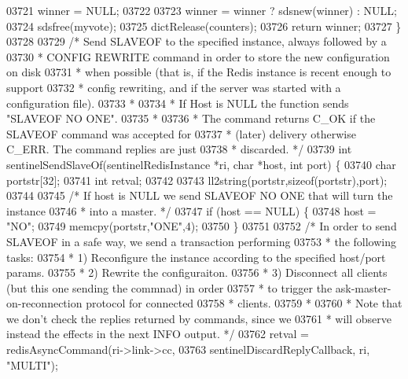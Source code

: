 \begin{DoxyCode}
{{{{{{{{{{{{{{{{{{{{{{{{{{{{{{{{{{{{{{{{{{{{{{{{{{{{{{{{{{{{{{{{{{{{{{{{{{{{{{{{{{{03721         winner = NULL;
03722 
03723     winner = winner ? sdsnew(winner) : NULL;
03724     sdsfree(myvote);
03725     dictRelease(counters);
03726     \textcolor{keywordflow}{return} winner;
03727 \}
03728 
03729 \textcolor{comment}{/* Send SLAVEOF to the specified instance, always followed by a}
03730 \textcolor{comment}{ * CONFIG REWRITE command in order to store the new configuration on disk}
03731 \textcolor{comment}{ * when possible (that is, if the Redis instance is recent enough to support}
03732 \textcolor{comment}{ * config rewriting, and if the server was started with a configuration file).}
03733 \textcolor{comment}{ *}
03734 \textcolor{comment}{ * If Host is NULL the function sends "SLAVEOF NO ONE".}
03735 \textcolor{comment}{ *}
03736 \textcolor{comment}{ * The command returns C\_OK if the SLAVEOF command was accepted for}
03737 \textcolor{comment}{ * (later) delivery otherwise C\_ERR. The command replies are just}
03738 \textcolor{comment}{ * discarded. */}
03739 \textcolor{keywordtype}{int} sentinelSendSlaveOf(sentinelRedisInstance *ri, \textcolor{keywordtype}{char} *host, \textcolor{keywordtype}{int} port) \{
03740     \textcolor{keywordtype}{char} portstr[32];
03741     \textcolor{keywordtype}{int} retval;
03742 
03743     ll2string(portstr,\textcolor{keyword}{sizeof}(portstr),port);
03744 
03745     \textcolor{comment}{/* If host is NULL we send SLAVEOF NO ONE that will turn the instance}
03746 \textcolor{comment}{     * into a master. */}
03747     \textcolor{keywordflow}{if} (host == NULL) \{
03748         host = \textcolor{stringliteral}{"NO"};
03749         memcpy(portstr,\textcolor{stringliteral}{"ONE"},4);
03750     \}
03751 
03752     \textcolor{comment}{/* In order to send SLAVEOF in a safe way, we send a transaction performing}
03753 \textcolor{comment}{     * the following tasks:}
03754 \textcolor{comment}{     * 1) Reconfigure the instance according to the specified host/port params.}
03755 \textcolor{comment}{     * 2) Rewrite the configuraiton.}
03756 \textcolor{comment}{     * 3) Disconnect all clients (but this one sending the commnad) in order}
03757 \textcolor{comment}{     *    to trigger the ask-master-on-reconnection protocol for connected}
03758 \textcolor{comment}{     *    clients.}
03759 \textcolor{comment}{     *}
03760 \textcolor{comment}{     * Note that we don't check the replies returned by commands, since we}
03761 \textcolor{comment}{     * will observe instead the effects in the next INFO output. */}
03762     retval = redisAsyncCommand(ri->link->cc,
03763         sentinelDiscardReplyCallback, ri, \textcolor{stringliteral}{"MULTI"});
}}}}}}}}}}}}}}}}}}}}}}}}}}}}}}}}}}}}}}}}}}}}}}}}}}}}}}}}}}}}}}}}}}}}}}}}}}}}}}}}}}}
\end{DoxyCode}

